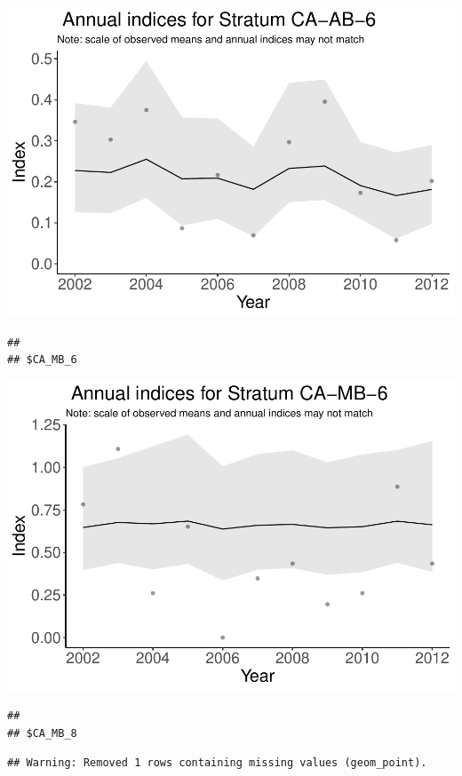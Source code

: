 \documentclass[]{article}
\begin{document}
\includegraphics{index_files/figure-latex/unnamed-chunk-7-3.pdf}

\begin{verbatim}
## 
## $CA_MB_6
\end{verbatim}

\includegraphics{index_files/figure-latex/unnamed-chunk-7-4.pdf}

\begin{verbatim}
## 
## $CA_MB_8
\end{verbatim}

\begin{verbatim}
## Warning: Removed 1 rows containing missing values (geom_point).
\end{verbatim}
\end{document}
